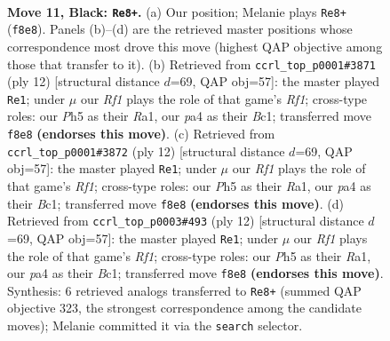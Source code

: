 \documentclass[11pt]{article}
\begin{document}
\clearpage

\begin{figure}[p]\centering
\begin{subfigure}{0.46\textwidth}\centering
\resizebox{\linewidth}{!}{%
\newchessgame
\chessboard[
  setfen={rnbq1rk1/p4pp1/1p3n2/3p3p/Pb1P3P/2NB1NP1/1P3P2/R1BQK2R b KQ - 0 11},
  showmover=false,
  pgfstyle=straightmove, color=movearrow, markmove={f8-e8}
]}
\caption{}
\end{subfigure}\hfill
\begin{subfigure}{0.46\textwidth}\centering
\resizebox{\linewidth}{!}{%
\newchessgame
\chessboard[
  setfen={r1bqk2r/ppp2ppp/2np1n2/1B2p3/4P3/2P2N2/PPP2PPP/R1BQ1RK1 w kq - 0 7},
  showmover=false,
  pgfstyle=straightmove, color=movearrow, markmove={f1-e1}
]}
\caption{}
\end{subfigure}
\\[4pt]
\begin{subfigure}{0.46\textwidth}\centering
\resizebox{\linewidth}{!}{%
\newchessgame
\chessboard[
  setfen={r1bqk2r/ppp2ppp/2np1n2/1B2p3/4P3/2P2N2/PPP2PPP/R1BQ1RK1 w kq - 0 7},
  showmover=false,
  pgfstyle=straightmove, color=movearrow, markmove={f1-e1}
]}
\caption{}
\end{subfigure}\hfill
\begin{subfigure}{0.46\textwidth}\centering
\resizebox{\linewidth}{!}{%
\newchessgame
\chessboard[
  setfen={r1bqk2r/ppp2ppp/2np1n2/1B2p3/4P3/2P2N2/PPP2PPP/R1BQ1RK1 w kq - 0 7},
  showmover=false,
  pgfstyle=straightmove, color=movearrow, markmove={f1-e1}
]}
\caption{}
\end{subfigure}
\caption{\textbf{Move 11, Black: \texttt{Re8+}.} (a) Our position; Melanie plays \texttt{Re8+} (\texttt{f8e8}). Panels (b)--(d) are the retrieved master positions whose correspondence most drove this move (highest QAP objective among those that transfer to it). (b) Retrieved from \texttt{ccrl\_top\_p0001\#3871} (ply 12) [structural distance $d$=69, QAP obj=57]: the master played \texttt{Re1}; under $\mu$ our \emph{Rf1} plays the role of that game's \emph{Rf1}; cross-type roles: our \emph{P}h5 as their \emph{R}a1, our \emph{p}a4 as their \emph{B}c1; transferred move \texttt{f8e8} \textbf{(endorses this move)}. (c) Retrieved from \texttt{ccrl\_top\_p0001\#3872} (ply 12) [structural distance $d$=69, QAP obj=57]: the master played \texttt{Re1}; under $\mu$ our \emph{Rf1} plays the role of that game's \emph{Rf1}; cross-type roles: our \emph{P}h5 as their \emph{R}a1, our \emph{p}a4 as their \emph{B}c1; transferred move \texttt{f8e8} \textbf{(endorses this move)}. (d) Retrieved from \texttt{ccrl\_top\_p0003\#493} (ply 12) [structural distance $d$=69, QAP obj=57]: the master played \texttt{Re1}; under $\mu$ our \emph{Rf1} plays the role of that game's \emph{Rf1}; cross-type roles: our \emph{P}h5 as their \emph{R}a1, our \emph{p}a4 as their \emph{B}c1; transferred move \texttt{f8e8} \textbf{(endorses this move)}. Synthesis: 6 retrieved analogs transferred to \texttt{Re8+} (summed QAP objective 323, the strongest correspondence among the candidate moves); Melanie committed it via the \texttt{search} selector.}
\label{fig:thought-m21}
\end{figure}
\end{document}
